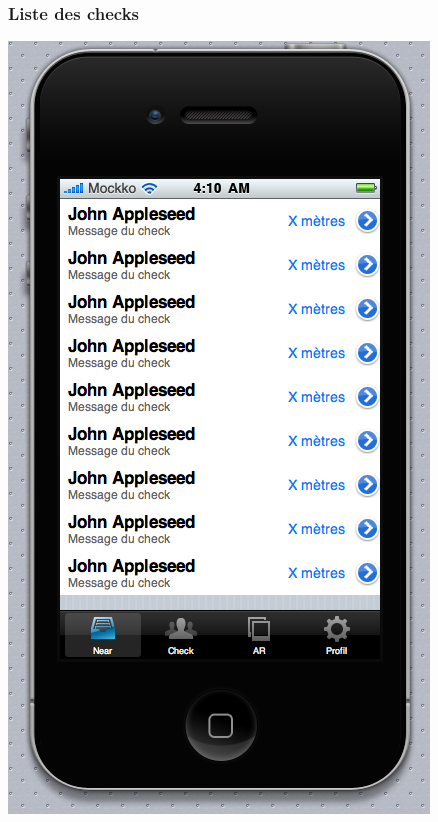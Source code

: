 \documentclass[a4paper,12pt]{report}
\begin{document}
\begin{onehalfspace}
\subsubsection{Liste des checks}
\includegraphics[height=\thehauteurscreen cm]{img/2_near.png}


\end{onehalfspace}
\end{document}
